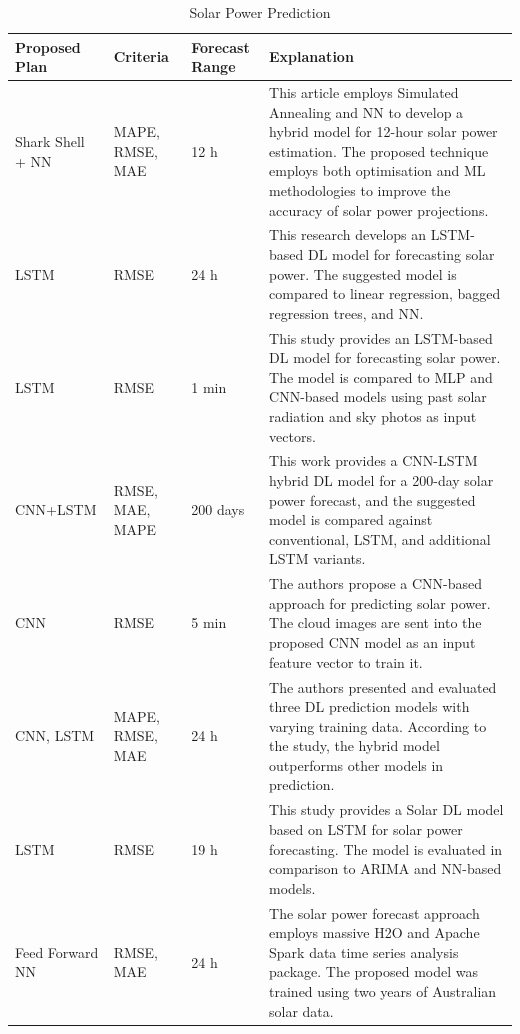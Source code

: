 \documentclass[a4paper,fleqn]{cas-sc}
\begin{document}
\begin{longtable}[c]{|p{}|p{}|p{}|p{}|}
\caption{Solar Power Prediction}
\label{tab:my-table}\\
\hline
\textbf{Proposed Plan} & \textbf{Criteria} & \textbf{Forecast Range} & \textbf{Explanation} \\
\hline
\endhead
Shark Shell + NN\cite{lee2018forecasting} & MAPE, RMSE, MAE & 12 h & This article employs Simulated Annealing and NN to develop a hybrid model for 12-hour solar power estimation. The proposed technique employs both optimisation and ML methodologies to improve the accuracy of solar power projections. \\ \hline
LSTM\cite{abedinia2018solar} & RMSE & 24 h & This research develops an LSTM-based DL model for forecasting solar power. The suggested model is compared to linear regression, bagged regression trees, and NN. \\ \hline
LSTM\cite{abedinia2018solar}& RMSE & 1 min &This study provides an LSTM-based DL model for forecasting solar power. The model is compared to MLP and CNN-based models using past solar radiation and sky photos as input vectors. \\ \hline
CNN+LSTM\cite{lee2018forecasting} & RMSE, MAE, MAPE & 200 days &This work provides a CNN-LSTM hybrid DL model for a 200-day solar power forecast, and the suggested model is compared against conventional, LSTM, and additional LSTM variants. \\
CNN\cite{zhang2018deep} & RMSE & 5 min & The authors propose a CNN-based approach for predicting solar power. The cloud images are sent into the proposed CNN model as an input feature vector to train it. \\ \hline
CNN, LSTM\cite{wang2019comparison} & MAPE, RMSE, MAE & 24 h & The authors presented and evaluated three DL prediction models with varying training data. According to the study, the hybrid model outperforms other models in prediction. \\ \hline
LSTM\cite{lee2019deep} & RMSE & 19 h & This study provides a Solar DL model based on LSTM for solar power forecasting. The model is evaluated in comparison to ARIMA and NN-based models. \\
Feed Forward NN\cite{torres2019big} & RMSE, MAE & 24 h & The solar power forecast approach employs massive H2O and Apache Spark data time series analysis package. The proposed model was trained using two years of Australian solar data. \\ \hline

\end{longtable}
\end{document}
